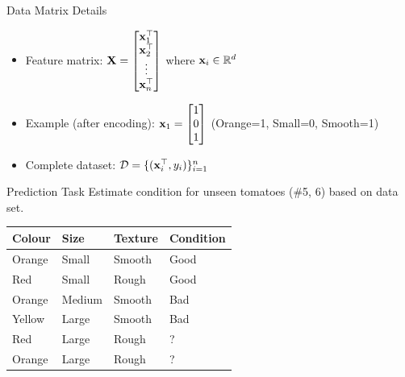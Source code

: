 \documentclass[usenames,dvipsnames]{beamer}
\begin{document}
\begin{frame}{Data Matrix Details}
\begin{itemize}
	\item Feature matrix: $\mathbf{X} = \begin{bmatrix} \mathbf{x}_1^\top \\ \mathbf{x}_2^\top \\ \vdots \\ \mathbf{x}_n^\top \end{bmatrix}$ where $\mathbf{x}_i \in \mathbb{R}^d$
	\item \pause Example (after encoding): $\mathbf{x}_1 = \begin{bmatrix}
	1 \\ 
	0 \\
	1 \\
	\end{bmatrix}$ (Orange=1, Small=0, Smooth=1)
	\item \pause Complete dataset: $\mathcal{D} = \{(\mathbf{x}_i^\top, y_i)\}_{i=1}^n$
\end{itemize}

\end{frame}


\begin{frame}{Prediction Task}
Estimate condition for unseen tomatoes (\#5, 6) based on data set. 

\begin{table}[]
	\begin{tabular}{|l|l|l||l|}
		\hline 
		
		\textbf{Colour} & \textbf{Size} & \textbf{Texture} & \textbf{Condition} \\ \hline 
		Orange & Small & Smooth  & Good      \\
		Red    & Small  & Rough  & Good \\
		Orange & Medium & Smooth & Bad \\
		Yellow & Large  & Smooth & Bad \\ \hline
		Red    & Large  & Rough  & ? \\
		Orange &  Large & Rough  & ? \\ \hline          
	\end{tabular}
\end{table}
\end{frame}
\end{document}
